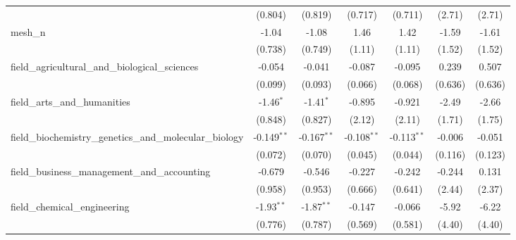 \begin{tabular}{lcccccc}
                                                               & (0.804)        & (0.819)        & (0.717)        & (0.711)         & (2.71)       & (2.71)\\   
   mesh\_n                                                     & -1.04          & -1.08          & 1.46           & 1.42            & -1.59        & -1.61\\   
                                                               & (0.738)        & (0.749)        & (1.11)         & (1.11)          & (1.52)       & (1.52)\\   
   field\_agricultural\_and\_biological\_sciences              & -0.054         & -0.041         & -0.087         & -0.095          & 0.239        & 0.507\\   
                                                               & (0.099)        & (0.093)        & (0.066)        & (0.068)         & (0.636)      & (0.636)\\   
   field\_arts\_and\_humanities                                & -1.46$^{*}$    & -1.41$^{*}$    & -0.895         & -0.921          & -2.49        & -2.66\\   
                                                               & (0.848)        & (0.827)        & (2.12)         & (2.11)          & (1.71)       & (1.75)\\   
   field\_biochemistry\_genetics\_and\_molecular\_biology      & -0.149$^{**}$  & -0.167$^{**}$  & -0.108$^{**}$  & -0.113$^{**}$   & -0.006       & -0.051\\   
                                                               & (0.072)        & (0.070)        & (0.045)        & (0.044)         & (0.116)      & (0.123)\\   
   field\_business\_management\_and\_accounting                & -0.679         & -0.546         & -0.227         & -0.242          & -0.244       & 0.131\\   
                                                               & (0.958)        & (0.953)        & (0.666)        & (0.641)         & (2.44)       & (2.37)\\   
   field\_chemical\_engineering                                & -1.93$^{**}$   & -1.87$^{**}$   & -0.147         & -0.066          & -5.92        & -6.22\\   
                                                               & (0.776)        & (0.787)        & (0.569)        & (0.581)         & (4.40)       & (4.40)\\   

\end{tabular}
